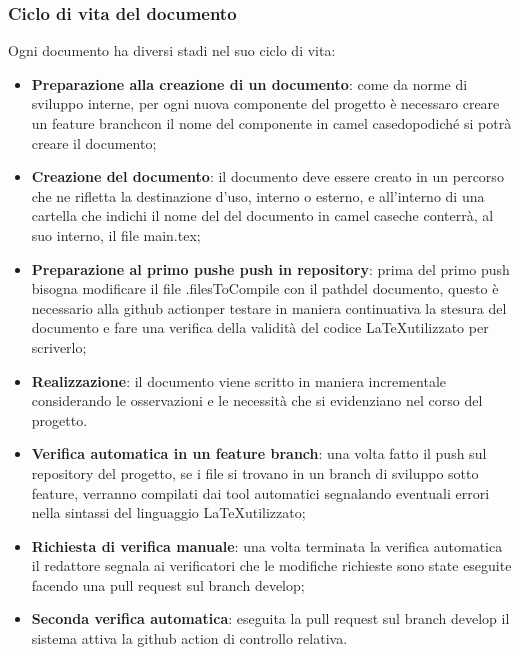 \subsubsection{Ciclo di vita del documento}
Ogni documento ha diversi stadi nel suo ciclo di vita:
\begin{itemize}
  \item \textbf{Preparazione alla creazione di un documento}: come da norme di
  sviluppo interne, per ogni nuova componente del progetto \`e necessaro creare un
  feature branch\glo con il nome del componente in camel case\glo dopodich\'e
  si potr\`a creare il documento;

  \item \textbf{Creazione del documento}: il documento deve essere creato in un
  percorso che ne rifletta la destinazione d'uso, interno o esterno, e
  all'interno di una cartella che indichi il nome del del documento in
  camel case\glo che conterr\`a, al suo interno, il file main.tex;

  \item \textbf{Preparazione al primo push\glo e push in repository\glo}: prima del primo
   push bisogna modificare il file .filesToCompile con il path\glo del documento,
   questo \`e necessario alla github action\glo per testare in maniera continuativa
   la stesura del documento e fare una verifica della validit\`a del codice
   \LaTeX \space utilizzato per scriverlo;

  \item \textbf{Realizzazione}: il documento viene scritto in maniera incrementale
  considerando le osservazioni e le necessit\`a che si evidenziano nel corso del
  progetto.

  \item \textbf{Verifica automatica in un feature branch}: una volta fatto il push
  sul repository del progetto, se i file si trovano in un branch di sviluppo
  sotto feature, verranno compilati dai tool automatici segnalando eventuali errori
  nella sintassi del linguaggio \LaTeX \space utilizzato;

  \item \textbf{Richiesta di verifica manuale}: una volta terminata la verifica
  automatica il redattore segnala ai verificatori che le modifiche richieste
  sono state eseguite facendo una pull request sul branch develop;

  \item \textbf{Seconda verifica automatica}: eseguita la pull request sul branch
  develop il sistema attiva la github action di controllo relativa.


\end{itemize}
